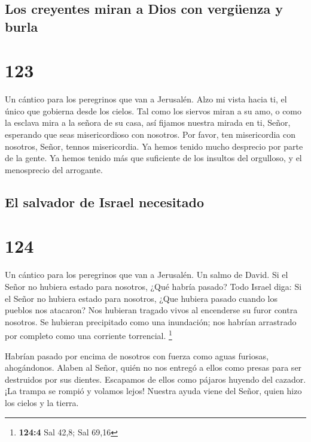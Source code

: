 \hypertarget{los-creyentes-miran-a-dios-con-verguxfcenza-y-burla}{%
\subsection{Los creyentes miran a Dios con vergüenza y
burla}\label{los-creyentes-miran-a-dios-con-verguxfcenza-y-burla}}

\hypertarget{section-122}{%
\section{123}\label{section-122}}

Un cántico para los peregrinos que van a Jerusalén.  Alzo mi
vista hacia ti, el único que gobierna desde los cielos.  Tal
como los siervos miran a su amo, o como la esclava mira a la señora de
su casa, así fijamos nuestra mirada en ti, Señor, esperando que seas
misericordioso con nosotros.  Por favor, ten misericordia
con nosotros, Señor, tennos misericordia. Ya hemos tenido mucho
desprecio por parte de la gente.  Ya hemos tenido más que
suficiente de los insultos del orgulloso, y el menosprecio del
arrogante.

\hypertarget{el-salvador-de-israel-necesitado}{%
\subsection{El salvador de Israel
necesitado}\label{el-salvador-de-israel-necesitado}}

\hypertarget{section-123}{%
\section{124}\label{section-123}}

Un cántico para los peregrinos que van a Jerusalén. Un salmo de David.
 Si el Señor no hubiera estado para nosotros, ¿Qué habría
pasado? Todo Israel diga:  Si el Señor no hubiera estado
para nosotros, ¿Que hubiera pasado cuando los pueblos nos atacaron?
 Nos hubieran tragado vivos al encenderse su furor contra
nosotros.  Se hubieran precipitado como una inundación; nos
habrían arrastrado por completo como una corriente torrencial.
\footnote{\textbf{124:4} Sal 42,8; Sal 69,16}

 Habrían pasado por encima de nosotros con fuerza como aguas
furiosas, ahogándonos.  Alaben al Señor, quién no nos
entregó a ellos como presas para ser destruidos por sus dientes.
 Escapamos de ellos como pájaros huyendo del cazador. ¡La
trampa se rompió y volamos lejos!  Nuestra ayuda viene del
Señor, quien hizo los cielos y la tierra.

